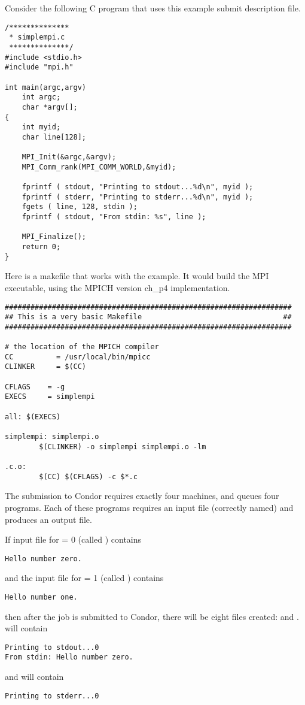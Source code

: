 Consider the following C program that uses this example submit
description file.

\begin{verbatim}
/**************
 * simplempi.c
 **************/
#include <stdio.h>
#include "mpi.h"

int main(argc,argv)
    int argc;
    char *argv[];
{
    int myid;
    char line[128];

    MPI_Init(&argc,&argv);
    MPI_Comm_rank(MPI_COMM_WORLD,&myid);

    fprintf ( stdout, "Printing to stdout...%d\n", myid );
    fprintf ( stderr, "Printing to stderr...%d\n", myid );
    fgets ( line, 128, stdin );
    fprintf ( stdout, "From stdin: %s", line );

    MPI_Finalize();
    return 0;
}
\end{verbatim}

Here is a makefile that works with the example.
It would build the MPI executable, using the MPICH
version ch\_p4 implementation.
\begin{verbatim}
###################################################################
## This is a very basic Makefile                                 ##
###################################################################

# the location of the MPICH compiler
CC          = /usr/local/bin/mpicc
CLINKER     = $(CC)

CFLAGS    = -g
EXECS     = simplempi

all: $(EXECS)

simplempi: simplempi.o
        $(CLINKER) -o simplempi simplempi.o -lm

.c.o:
        $(CC) $(CFLAGS) -c $*.c
\end{verbatim}

The submission to Condor requires exactly four machines,
and queues four programs.
Each of these programs requires an input file (correctly
named) and produces an output file.

If input file for  = 0 (called ) contains
\begin{verbatim}
Hello number zero.
\end{verbatim}
and
the input file for  = 1 (called ) contains
\begin{verbatim}
Hello number one.
\end{verbatim}
then after the job is submitted to Condor,
there will be 
eight files created:  
 and .
 will contain
\begin{verbatim}
Printing to stdout...0
From stdin: Hello number zero.
\end{verbatim}
and  will contain
\begin{verbatim}
Printing to stderr...0
\end{verbatim}

